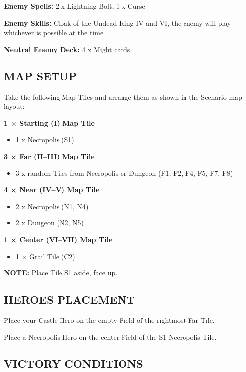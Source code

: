 \begin{multicols*}{2}
\textbf{Enemy Spells:} 2 x Lightning Bolt, 1 x Curse

\textbf{Enemy Skills:} Cloak of the Undead King IV and VI, the enemy will play whichever is possible at the time

\textbf{Neutral Enemy Deck:} 4 x Might cards

\subsection*{\MakeUppercase{Map setup}}

Take the following Map Tiles and arrange them as shown in the Scenario map layout:

\textbf{1 × Starting (I) Map Tile}
\begin{itemize}
    \item 1 x Necropolis (S1)
\end{itemize}

\textbf{3 × Far (II--III) Map Tile}
\begin{itemize}
    \item 3 x random Tiles from Necropolis or Dungeon (F1, F2, F4, F5, F7, F8)
\end{itemize}

\textbf{4 × Near (IV--V) Map Tile}
\begin{itemize}
    \item 2 x Necropolis (N1, N4)
    \item 2 x Dungeon (N2, N5)
\end{itemize}

\textbf{1 × Center (VI--VII) Map Tile}
\begin{itemize}
  \item 1 × Grail Tile (C2)
\end{itemize}

\textbf{\MakeUppercase{Note:}} Place Tile S1 aside, face up.

\subsection*{\MakeUppercase{Heroes placement}}

Place your Castle Hero on the empty Field of the rightmost Far Tile.

Place a Necropolis Hero on the center Field of the S1 Necropolis Tile.

\subsection*{\MakeUppercase{Victory Conditions}}


\end{multicols*}
